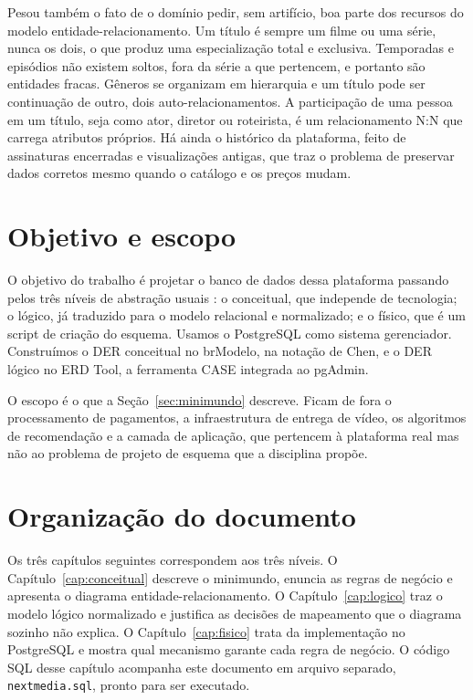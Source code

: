 \documentclass[a4paper,12pt,oneside,openany]{book}
\newcommand{\bd}[1]{\texttt{#1}}
\begin{document}
Pesou também o fato de o domínio pedir, sem artifício, boa parte dos recursos
do modelo entidade-relacionamento. Um título é sempre um filme ou uma série,
nunca os dois, o que produz uma especialização total e exclusiva. Temporadas
e episódios não existem soltos, fora da série a que pertencem, e portanto são
entidades fracas. Gêneros se organizam em hierarquia e um título pode ser
continuação de outro, dois auto-relacionamentos. A participação de uma pessoa
em um título, seja como ator, diretor ou roteirista, é um relacionamento N:N
que carrega atributos próprios. Há ainda o histórico da plataforma, feito de
assinaturas encerradas e visualizações antigas, que traz o problema
de preservar dados corretos mesmo quando o catálogo e os preços mudam.

\section{Objetivo e escopo}

O objetivo do trabalho é projetar o banco de dados dessa plataforma passando
pelos três níveis de abstração usuais \citep{elmasri2019}: o conceitual, que
independe de tecnologia; o lógico, já traduzido para o modelo relacional e
normalizado; e o físico, que é um script de criação do esquema.
Usamos o PostgreSQL como sistema gerenciador. Construímos o DER conceitual no
brModelo, na notação de Chen, e o DER lógico no ERD Tool, a ferramenta CASE
integrada ao pgAdmin.

O escopo é o que a Seção~\ref{sec:minimundo} descreve. Ficam de fora o
processamento de pagamentos, a infraestrutura de entrega de vídeo, os
algoritmos de recomendação e a camada de aplicação, que pertencem à plataforma
real mas não ao problema de projeto de esquema que a disciplina propõe.

\section{Organização do documento}

Os três capítulos seguintes correspondem aos três níveis. O
Capítulo~\ref{cap:conceitual} descreve o minimundo, enuncia as regras de
negócio e apresenta o diagrama entidade-relacionamento. O
Capítulo~\ref{cap:logico} traz o modelo lógico normalizado e justifica as
decisões de mapeamento que o diagrama sozinho não explica. O
Capítulo~\ref{cap:fisico} trata da implementação no PostgreSQL e mostra qual
mecanismo garante cada regra de negócio. O código SQL desse capítulo acompanha
este documento em arquivo separado, \bd{nextmedia.sql}, pronto para ser
executado.
\end{document}
